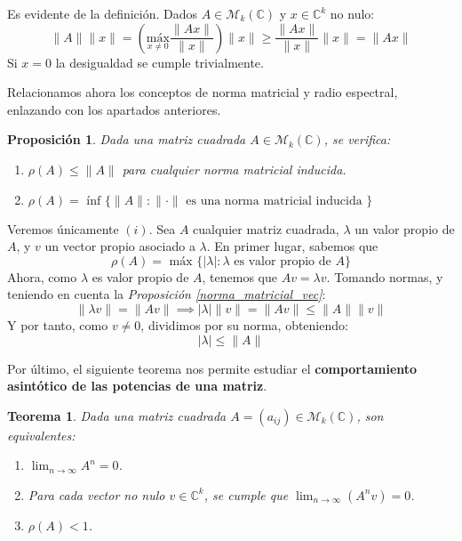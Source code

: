 \documentclass[11pt, a4paper]{article}
\makeatletter
\newif\IfInSansMode
\let\oldsf\sffamily
\renewcommand*{\sffamily}{\oldsf\mathversion{sans}\InSansModetrue}
\let\oldnorm\normalfont
\renewcommand*{\normalfont}{\oldnorm\InSansModefalse\mathversion{normal}}
\renewenvironment{proof}[1][\proofname] {\vspace{-15pt}\par\pushQED{\qed}\normalfont\topsep6\p@\@plus6\p@\relax\trivlist\item[\hskip\labelsep\it#1\@addpunct{.}]\ignorespaces}{\popQED\endtrivlist\@endpefalse}
\numberwithin{equation}{section}
\newcommand{\la}{\lambda}
\renewenvironment{proof}[1][\proofname] {\par\pushQED{\qed}\normalfont\topsep6\p@\@plus6\p@\relax\trivlist\item[\hskip\labelsep\itshape\sffamily#1\@addpunct{.}]\ignorespaces}{\popQED\endtrivlist\@endpefalse}
\theoremstyle{theorem-style}
\newtheorem{nth}{Teorema}[section]
\newtheorem{nprop}{Proposición}[section]
\theoremstyle{definition-style}
\theoremstyle{remark-style}
\theoremstyle{example-style}
\newenvironment{nlist}
{\begin{enumerate}
    \renewcommand\labelenumi{(\emph{\roman{enumi})}}}
  {\end{enumerate}}
\makeatother
\begin{document}
\begin{proof} Es evidente de la definición. Dados $A \in \mathcal M_k(\mathbb{C})$ y $x \in \mathbb{C}^k$ no nulo: $$\|A\|\|x\| = \left(\underset{x \ne 0}{\text{máx}} \frac{\|Ax\|}{\|x\|}\right)\|x\| \ge \frac{\|Ax\|}{\|x\|}\|x\| = \|Ax\|$$ Si $x = 0$ la desigualdad se cumple trivialmente.
\end{proof}

Relacionamos ahora los conceptos de norma matricial y radio espectral, enlazando con los apartados anteriores.

\begin{nprop}
    Dada una matriz cuadrada $A \in \mathcal M_k(\mathbb{C})$, se verifica: \begin{nlist}
        \item $\rho(A) \leq \|A\|$ para cualquier norma matricial inducida.
        \item $\rho(A) = \text{ ínf } \{\|A\| : \|\cdot\| \text{ es una norma matricial inducida } \}$
    \end{nlist}
\end{nprop}

\begin{proof} Veremos únicamente $(i)$. Sea $A$ cualquier matriz cuadrada, $\lambda$ un valor propio de $A$, y $v$ un vector propio asociado a $\lambda$. En primer lugar, sabemos que $$\rho(A) = \text{ máx } \{ |\lambda| : \lambda \text{ es valor propio de } A \}$$ Ahora, como $\la$ es valor propio de $A$, tenemos que $Av = \la v$. Tomando normas, y teniendo en cuenta la \textit{Proposición \ref{norma_matricial_vec}}:
$$\|\lambda v\| = \|Av\| \implies |\la|\|v\| = \|Av\| \le \|A\|\|v\|$$
Y por tanto, como $v\ne 0$, dividimos por su norma, obteniendo: $$|\lambda| \le \|A\|$$\end{proof}

Por último, el siguiente teorema nos permite estudiar el \textbf{comportamiento asintótico de las potencias de una matriz}.
\begin{nth}
    Dada una matriz cuadrada $A = (a_{ij})\in \mathcal M_k(\mathbb C)$, son equivalentes: 
    \begin{nlist}
        \item $\displaystyle \lim_{n \to \infty} A^n = 0$.
        \item Para cada vector no nulo $v \in \mathbb C^{k}$, se cumple que $\displaystyle \lim_{n \to \infty}(A^n v) = 0$.
        \item $\rho(A) < 1$.
    \end{nlist}
\end{nth}
\end{document}
